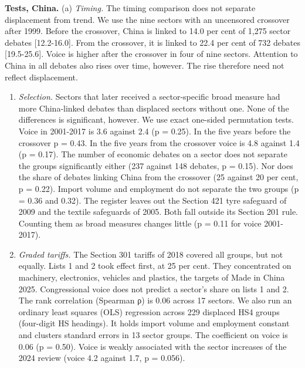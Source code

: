 \textbf{Tests, China.} (a) \emph{Timing.} The timing comparison does not
separate displacement from trend. We use the nine sectors with an
uncensored crossover after 1999. Before the crossover, China is linked
to 14.0 per cent of 1,275 sector debates {[}12.2-16.0{]}. From the
crossover, it is linked to 22.4 per cent of 732 debates {[}19.5-25.6{]}.
Voice is higher after the crossover in four of nine sectors. Attention
to China in all debates also rises over time, however. The rise
therefore need not reflect displacement.

\begin{enumerate}
\def\labelenumi{(\alph{enumi})}
\setcounter{enumi}{1}
\item
  \emph{Selection.} Sectors that later received a sector-specific broad
  measure had more China-linked debates than displaced sectors without
  one. None of the differences is significant, however. We use exact
  one-sided permutation tests. Voice in 2001-2017 is 3.6 against 2.4 (p
  = 0.25). In the five years before the crossover p = 0.43. In the five
  years from the crossover voice is 4.8 against 1.4 (p = 0.17). The
  number of economic debates on a sector does not separate the groups
  significantly either (237 against 148 debates, p = 0.15). Nor does the
  share of debates linking China from the crossover (25 against 20 per
  cent, p = 0.22). Import volume and employment do not separate the two
  groups (p = 0.36 and 0.32). The register leaves out the Section 421
  tyre safeguard of 2009 and the textile safeguards of 2005. Both fall
  outside its Section 201 rule. Counting them as broad measures changes
  little (p = 0.11 for voice 2001-2017).
\item
  \emph{Graded tariffs.} The Section 301 tariffs of 2018 covered all
  groups, but not equally. Lists 1 and 2 took effect first, at 25 per
  cent. They concentrated on machinery, electronics, vehicles and
  plastics, the targets of Made in China 2025. Congressional voice does
  not predict a sector's share on lists 1 and 2. The rank correlation
  (Spearman ρ) is 0.06 across 17 sectors. We also run an ordinary least
  squares (OLS) regression across 229 displaced HS4 groups (four-digit
  HS headings). It holds import volume and employment constant and
  clusters standard errors in 13 sector groups. The coefficient on voice
  is 0.06 (p = 0.50). Voice is weakly associated with the sector
  increases of the 2024 review (voice 4.2 against 1.7, p = 0.056).
\end{enumerate}

